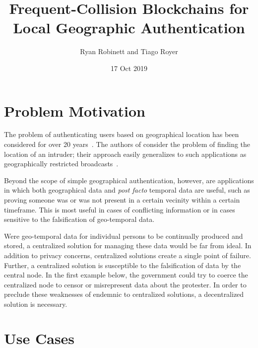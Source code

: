 \documentclass{article}
\title{Frequent-Collision Blockchains for Local Geographic Authentication}
\author{Ryan Robinett and Tiago Royer}
\date{17 Oct 2019}
\begin{document}
\maketitle

\section*{Problem Motivation}

The problem of authenticating users based on geographical location
has been considered for over 20 years~\cite{denning_1996}.
The authors of \cite{denning_1996} consider the problem of finding
the location of an intruder;
their approach easily generalizes to such applications as
geographically restricted broadcasts~\cite{gdpr}.

Beyond the scope of simple geographical authentication, however,
are applications in which both geographical data and \textit{post facto}
temporal data are useful, such as
proving someone was or was not present in a certain vecinity within a
certain timeframe.
This is most useful in cases of conflicting information or in cases sensitive to
the falsification of geo-temporal data.

Were geo-temporal data for individual persons to be continually produced and stored,
a centralized solution for managing these data would be far from ideal.
In addition to privacy concerns,
centralized solutions create a single point of failure.
Further,
a centralized solution is susceptible to the falsification of data
by the central node.
In the first example below,
the government could try to coerce the centralized node
to censor or misrepresent data about the protester.
In order to preclude these weaknesses of endemnic to centralized solutions,
a decentralized solution is necessary.

\section*{Use Cases}
\end{document}
